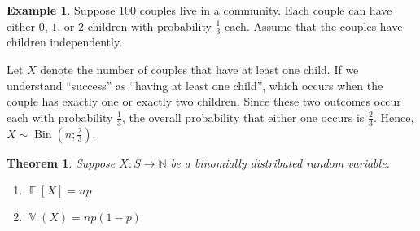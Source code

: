 \documentclass[11pt]{article}
\newtheorem{thm}{Theorem}
\theoremstyle{definition}
\newtheorem{eg}{Example}
\theoremstyle{remark}
\newcommand{\parens}[1]{\left(#1\right)}
\newcommand{\N}{\mathbb{N}}
\DeclareMathOperator{\Expect}{\mathbb{E}}
\newcommand{\E}[1]{\Expect{\left[#1\right]}}
\DeclareMathOperator{\Var}{\mathbb{V}}
\newcommand{\V}[1]{\Var{\parens{#1}}}
\DeclareMathOperator{\BinOp}{Bin}
\newcommand{\Bin}[1]{ \BinOp\parens{#1} }
\begin{document}
\begin{eg}
    Suppose $100$ couples live in a community.
    Each couple can have either $0$, $1$, or $2$ children with probability
    $\frac{1}{3}$ each.
    Assume that the couples have children independently.

    Let $X$ denote the number of couples that have at least one child.
    If we understand ``success'' as ``having at least one child'', which occurs
    when the couple has exactly one or exactly two children.
    Since these two outcomes occur each with probability $\frac{1}{3}$, the
    overall probability that either one occurs is $\frac{2}{3}$.
    Hence, $X \sim \Bin{n;\frac{2}{3}}$.
\end{eg}

\begin{thm}
    \label{thm:e-v-of-binomial-distribution}
    Suppose $X : S \to \N$ be a binomially distributed random variable.
    \begin{enumerate}
        \item $\E{X} = np$
        \item $\V{X} = np(1-p)$
    \end{enumerate}
\end{thm}
\end{document}
